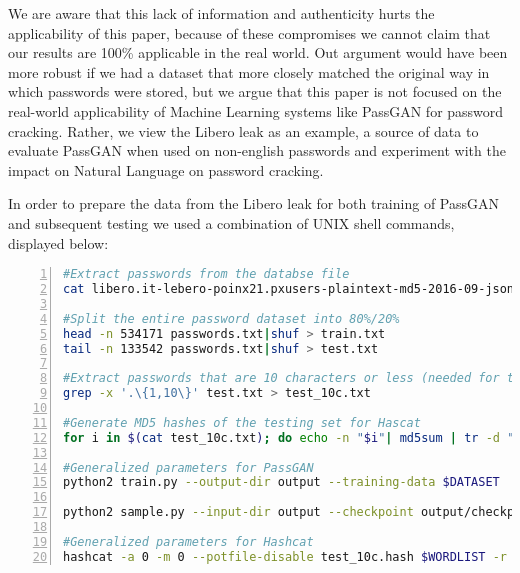 We are aware that this lack of information and authenticity hurts the applicability of this paper, because of these compromises we cannot claim that our results are 100\% applicable in the real world. Out argument would have been more robust if we had a dataset that more closely matched the original way in which passwords were stored, but we argue that this paper is not focused on the real-world applicability of Machine Learning systems like PassGAN for password cracking. 
Rather, we view the Libero leak as an example, a source of data to evaluate PassGAN when used on non-english passwords and experiment with the impact on Natural Language on password cracking.

In order to prepare the data from the Libero leak for both training of PassGAN and subsequent testing we used a combination of UNIX shell commands, displayed below:

\begin{lstlisting}[language=bash,numbers=left,stepnumber=1,breaklines=true,postbreak=\mbox{\textcolor{red}{$\hookrightarrow$}\space}]
#Extract passwords from the databse file
cat libero.it-lebero-poinx21.pxusers-plaintext-md5-2016-09-json-900k-users-extremely-private.txt|grep clearPassword |cut -d ":" -f 2 | awk '{gsub ("\"","");gsub(",","");print $1}' > passwords.txt

#Split the entire password dataset into 80%/20%
head -n 534171 passwords.txt|shuf > train.txt
tail -n 133542 passwords.txt|shuf > test.txt

#Extract passwords that are 10 characters or less (needed for testing)
grep -x '.\{1,10\}' test.txt > test_10c.txt

#Generate MD5 hashes of the testing set for Hascat
for i in $(cat test_10c.txt); do echo -n "$i"| md5sum | tr -d " -" >> test_10c.hash; done

#Generalized parameters for PassGAN
python2 train.py --output-dir output --training-data $DATASET

python2 sample.py --input-dir output --checkpoint output/checkpoints/checkpoint_95000.ckpt --output $WORDLIST -n $NUMBER_OF_SAMPLES #Usually set to 14344392

#Generalized parameters for Hashcat
hashcat -a 0 -m 0 --potfile-disable test_10c.hash $WORDLIST -r $RULESET -o out.txt
\end{lstlisting}

